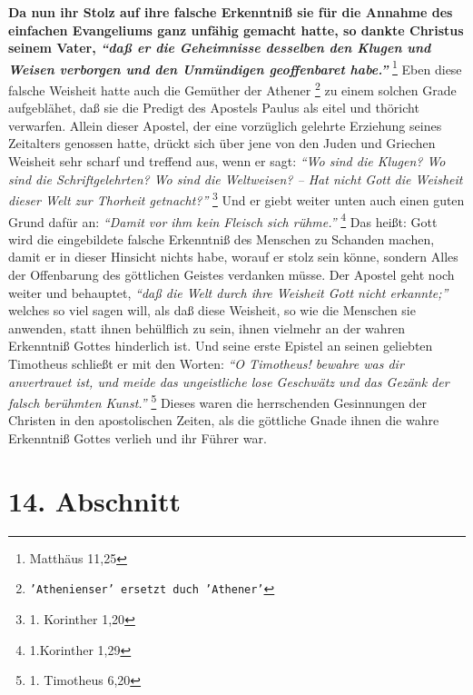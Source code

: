 \textbf{Da nun ihr Stolz auf ihre falsche Erkenntniß sie für die Annahme des einfachen
Evangeliums ganz unfähig gemacht hatte, so dankte Christus seinem Vater,
\textit{"`daß er die Geheimnisse desselben den Klugen und Weisen verborgen und den Unmündigen geoffenbaret habe."'}}
\footnote{Matthäus 11,25}
Eben diese falsche Weisheit hatte
auch die Gemüther der Athener \footnote{\texttt{'Athenienser' ersetzt duch 'Athener'}} zu einem solchen Grade aufgeblähet, daß sie
die Predigt des Apostels Paulus als eitel und thöricht verwarfen. Allein dieser
Apostel, der eine vorzüglich gelehrte Erziehung seines Zeitalters genossen
hatte, drückt sich über jene von den Juden und Griechen 
Weisheit sehr scharf und treffend aus, wenn er sagt:
\textit{"`Wo sind die Klugen? Wo
sind die Schriftgelehrten? Wo sind die Weltweisen? -- Hat nicht Gott die
Weisheit dieser Welt zur Thorheit getnacht?"'}
\footnote{1. Korinther 1,20}
Und er
giebt weiter unten auch einen guten Grund dafür an:
\textit{"`Damit vor ihm kein Fleisch sich rühme."'}
\footnote{1.Korinther 1,29}
Das heißt: Gott wird die eingebildete
falsche Erkenntniß des Menschen zu Schanden machen, damit er in dieser Hinsicht
nichts habe, worauf er stolz sein könne, sondern Alles der Offenbarung des
göttlichen Geistes verdanken müsse. Der Apostel geht noch weiter und behauptet,
\textit{"`daß die Welt durch ihre Weisheit Gott nicht erkannte;"'}
welches so viel sagen
will, als daß diese Weisheit, so wie die Menschen sie anwenden, statt ihnen
behülflich zu sein, ihnen vielmehr an der wahren Erkenntniß Gottes hinderlich
ist. Und seine erste Epistel an seinen geliebten Timotheus schließt er mit den
Worten:
\textit{"`O Timotheus! bewahre was dir anvertrauet ist, und meide das
ungeistliche lose Geschwätz und das Gezänk der falsch berühmten
Kunst."'}
\footnote{1. Timotheus 6,20}
Dieses waren die herrschenden Gesinnungen der
Christen in den apostolischen Zeiten, als die göttliche Gnade ihnen die wahre
Erkenntniß Gottes verlieh und ihr Führer war.

\section{14. Abschnitt} \label{kap7_ab14}

